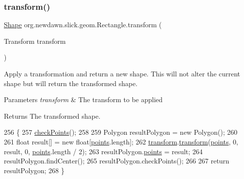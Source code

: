 \subsubsection{\texorpdfstring{transform()}{transform()}}
{\footnotesize\ttfamily \mbox{\hyperlink{classorg_1_1newdawn_1_1slick_1_1geom_1_1_shape}{Shape}} org.\+newdawn.\+slick.\+geom.\+Rectangle.\+transform (\begin{DoxyParamCaption}\item[{Transform}]{transform }\end{DoxyParamCaption})\hspace{0.3cm}{\ttfamily [inline]}}

Apply a transformation and return a new shape. This will not alter the current shape but will return the transformed shape.


\begin{DoxyParams}{Parameters}
{\em transform} & The transform to be applied \\
\hline
\end{DoxyParams}
\begin{DoxyReturn}{Returns}
The transformed shape. 
\end{DoxyReturn}

\begin{DoxyCode}
256                                                 \{
257         \mbox{\hyperlink{classorg_1_1newdawn_1_1slick_1_1geom_1_1_shape_a84293802d05e8666a441720bfc12745d}{checkPoints}}();
258         
259         Polygon resultPolygon = \textcolor{keyword}{new} Polygon();
260         
261         \textcolor{keywordtype}{float} result[] = \textcolor{keyword}{new} \textcolor{keywordtype}{float}[\mbox{\hyperlink{classorg_1_1newdawn_1_1slick_1_1geom_1_1_shape_a8b4d4058734bbb3b96072e470b92aa37}{points}}.length];
262         \mbox{\hyperlink{classorg_1_1newdawn_1_1slick_1_1geom_1_1_rectangle_a5036f16c079c7357f80030bf73b41983}{transform}}.\mbox{\hyperlink{classorg_1_1newdawn_1_1slick_1_1geom_1_1_shape_a463826a085479c379e40f012e970b997}{transform}}(\mbox{\hyperlink{classorg_1_1newdawn_1_1slick_1_1geom_1_1_shape_a8b4d4058734bbb3b96072e470b92aa37}{points}}, 0, result, 0, \mbox{\hyperlink{classorg_1_1newdawn_1_1slick_1_1geom_1_1_shape_a8b4d4058734bbb3b96072e470b92aa37}{points}}.length / 2);
263         resultPolygon.\mbox{\hyperlink{classorg_1_1newdawn_1_1slick_1_1geom_1_1_shape_a8b4d4058734bbb3b96072e470b92aa37}{points}} = result;
264         resultPolygon.findCenter();
265         resultPolygon.checkPoints();
266 
267         \textcolor{keywordflow}{return} resultPolygon;
268     \}
\end{DoxyCode}


